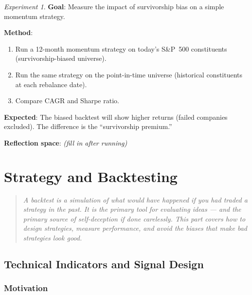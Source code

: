 \documentclass[a4paper, 11pt]{report}
\theoremstyle{definition}
\theoremstyle{remark}
\newtheorem{experiment}{Experiment}[chapter]
\begin{document}
\begin{experiment}
    \textbf{Goal}: Measure the impact of survivorship bias on a simple momentum
    strategy.

    \textbf{Method}:
    \begin{enumerate}
        \item Run a 12-month momentum strategy on today's S\&P~500 constituents
              (survivorship-biased universe).
        \item Run the same strategy on the point-in-time universe (historical
              constituents at each rebalance date).
        \item Compare CAGR and Sharpe ratio.
    \end{enumerate}

    \textbf{Expected}: The biased backtest will show higher returns (failed
    companies excluded).  The difference is the ``survivorship premium.''

    \textbf{Reflection space}: \emph{(fill in after running)}
\end{experiment}



\part{Strategy and Backtesting}
\label{part:backtest}

\begin{quote}
\itshape
A backtest is a simulation of what \emph{would have happened} if you had traded a
strategy in the past.  It is the primary tool for evaluating ideas --- and the
primary source of self-deception if done carelessly.  This part covers how to
design strategies, measure performance, and avoid the biases that make bad
strategies look good.
\end{quote}


\chapter{Technical Indicators and Signal Design}
\label{ch:indicators}

\section{Motivation}
\end{document}
